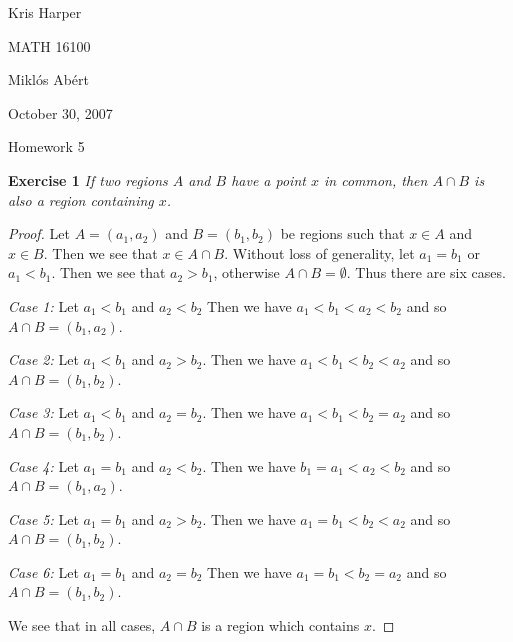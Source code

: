 \documentclass{article}
\begin{document}
\begin{flushright}
Kris Harper

MATH 16100

Mikl\'{o}s Ab\'{e}rt

October 30, 2007
\end{flushright}

\begin{center}
Homework 5
\end{center}

\begin{flushleft}

\textbf{Exercise 1}
\textsl{If two regions $A$ and $B$ have a point $x$ in common, then $A \cap B$ is also a region containing $x$.}
\begin{proof}
Let $A=(a_1,a_2)$ and $B=(b_1,b_2)$ be regions such that $x \in A$ and $x \in B$. Then we see that $x \in A \cap B$. Without loss of generality, let $a_1=b_1$ or $a_1<b_1$. Then we see that $a_2>b_1$, otherwise $A \cap B = \emptyset$. Thus there are six cases.\newline

\textsl{Case 1:} Let $a_1<b_1$ and $a_2<b_2$ Then we have $a_1<b_1<a_2<b_2$ and so $A \cap B = (b_1,a_2)$.\newline

\textsl{Case 2:} Let $a_1<b_1$ and $a_2>b_2$. Then we have $a_1<b_1<b_2<a_2$ and so $A \cap B = (b_1,b_2)$.\newline

\textsl{Case 3:} Let $a_1<b_1$ and $a_2=b_2$. Then we have $a_1<b_1<b_2=a_2$ and so $A \cap B = (b_1,b_2)$.\newline

\textsl{Case 4:} Let $a_1=b_1$ and $a_2<b_2$. Then we have $b_1=a_1<a_2<b_2$ and so $A \cap B = (b_1,a_2)$.\newline

\textsl{Case 5:} Let $a_1=b_1$ and $a_2>b_2$. Then we have $a_1=b_1<b_2<a_2$ and so $A \cap B = (b_1,b_2)$.\newline

\textsl{Case 6:} Let $a_1=b_1$ and $a_2=b_2$ Then we have $a_1=b_1<b_2=a_2$ and so $A \cap B = (b_1,b_2)$.\newline

We see that in all cases, $A \cap B$ is a region which contains $x$.
\end{proof}


\end{flushleft}
\end{document}
